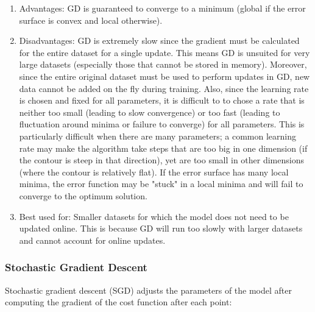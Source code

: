\documentclass[twoside,11pt]{homework}
\begin{document}
\begin{enumerate}
	\item Advantages: GD is guaranteed to converge to a minimum (global if the error surface is convex and local otherwise).
	\item Disadvantages: GD is extremely slow since the gradient must be calculated for the entire dataset for a single update. This means GD is unsuited for very large datasets (especially those that cannot be stored in memory). Moreover, since the entire original dataset must be used to perform updates in GD, new data cannot be added on the fly during training. Also, since the learning rate is chosen and fixed for all parameters, it is difficult to to chose a rate that is neither too small (leading to slow convergence) or too fast (leading to fluctuation around minima or failure to converge) for all parameters. This is particularly difficult when there are many parameters; a common learning rate may make the algorithm take steps that are too big in one dimension (if the contour is steep in that direction), yet are too small in other dimensions (where the contour is relatively flat). If the error surface has many local minima, the error function may be "stuck" in a local minima and will fail to converge to the optimum solution.
	\item Best used for: Smaller datasets for which the model does not need to be updated online. This is because GD will run too slowly with larger datasets and cannot account for online updates.
\end{enumerate}

\subsubsection*{Stochastic Gradient Descent}
Stochastic gradient descent (SGD) adjusts the parameters of the model after computing the gradient of the cost function after each point:
\end{document}

